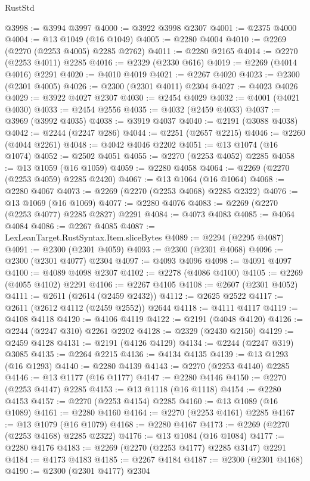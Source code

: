 \begin{lexlean}{RustStd}
\begin{coremodule}
{\begin{coremodule}
{{{{{{{{{{{{@3998 := @3994 @3997
@4000 := @3922 @3998 @2307
@4001 := @2375 @4000
@4004 := @13 @1049 (@16 @1049)
@4005 := @2280 @4004
@4010 := @2269 (@2270 (@2253 @4005) @2285 @2762)
@4011 := @2280 @2165
@4014 := @2270 (@2253 @4011) @2285
@4016 := @2329 (@2330 @616)
@4019 := @2269 (@4014 @4016) @2291
@4020 := @4010 @4019
@4021 := @2267 @4020
@4023 := @2300 (@2301 @4005)
@4026 := @2300 (@2301 @4011) @2304
@4027 := @4023 @4026
@4029 := @3922 @4027 @2307
@4030 := @2454 @4029
@4032 := @4001 (@4021 @4030)
@4033 := @2454 @2556
@4035 := @4032 (@2459 @4033)
@4037 := @3969 (@3992 @4035)
@4038 := @3919 @4037
@4040 := @2191 (@3088 @4038)
@4042 := @2244 (@2247 @286)
@4044 := @2251 (@2657 @2215)
@4046 := @2260 (@4044 @2261)
@4048 := @4042 @4046 @2202
@4051 := @13 @1074 (@16 @1074)
@4052 := @2502 @4051
@4055 := @2270 (@2253 @4052) @2285
@4058 := @13 @1059 (@16 @1059)
@4059 := @2280 @4058
@4064 := @2269 (@2270 (@2253 @4059) @2285 @2420)
@4067 := @13 @1064 (@16 @1064)
@4068 := @2280 @4067
@4073 := @2269 (@2270 (@2253 @4068) @2285 @2322)
@4076 := @13 @1069 (@16 @1069)
@4077 := @2280 @4076
@4083 := @2269 (@2270 (@2253 @4077) @2285 @2827) @2291
@4084 := @4073 @4083
@4085 := @4064 @4084
@4086 := @2267 @4085
@4087 := LexLeanTarget.RustSyntax.Item.sliceBytes
@4089 := @2294 (@2295 @4087)
@4091 := @2300 (@2301 @4059)
@4093 := @2300 (@2301 @4068)
@4096 := @2300 (@2301 @4077) @2304
@4097 := @4093 @4096
@4098 := @4091 @4097
@4100 := @4089 @4098 @2307
@4102 := @2278 (@4086 @4100)
@4105 := @2269 (@4055 @4102) @2291
@4106 := @2267 @4105
@4108 := @2607 (@2301 @4052)
@4111 := @2611 (@2614 (@2459 @2432))
@4112 := @2625 @2522
@4117 := @2611 (@2612 @4112 (@2459 @2552)) @2644
@4118 := @4111 @4117
@4119 := @4108 @4118
@4120 := @4106 @4119
@4122 := @2191 (@4048 @4120)
@4126 := @2244 (@2247 @310) @2261 @2202
@4128 := @2329 (@2430 @2150)
@4129 := @2459 @4128
@4131 := @2191 (@4126 @4129)
@4134 := @2244 (@2247 @319) @3085
@4135 := @2264 @2215
@4136 := @4134 @4135
@4139 := @13 @1293 (@16 @1293)
@4140 := @2280 @4139
@4143 := @2270 (@2253 @4140) @2285
@4146 := @13 @1177 (@16 @1177)
@4147 := @2280 @4146
@4150 := @2270 (@2253 @4147) @2285
@4153 := @13 @1118 (@16 @1118)
@4154 := @2280 @4153
@4157 := @2270 (@2253 @4154) @2285
@4160 := @13 @1089 (@16 @1089)
@4161 := @2280 @4160
@4164 := @2270 (@2253 @4161) @2285
@4167 := @13 @1079 (@16 @1079)
@4168 := @2280 @4167
@4173 := @2269 (@2270 (@2253 @4168) @2285 @2322)
@4176 := @13 @1084 (@16 @1084)
@4177 := @2280 @4176
@4183 := @2269 (@2270 (@2253 @4177) @2285 @3147) @2291
@4184 := @4173 @4183
@4185 := @2267 @4184
@4187 := @2300 (@2301 @4168)
@4190 := @2300 (@2301 @4177) @2304
}}}}}}}}}}}}
\end{coremodule}}
\end{coremodule}
\end{lexlean}
